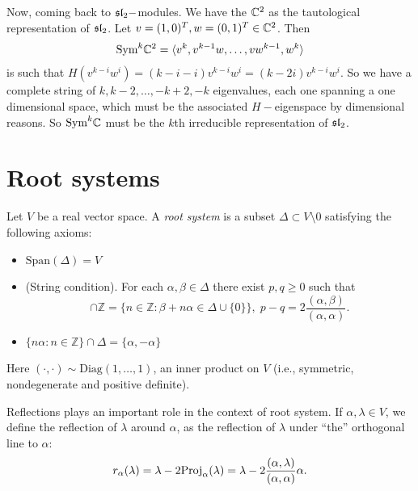 \begin{itemize}
  Now, coming back to $\mathfrak{sl}_2-$modules. We have the $\mathbb{C}^2$ as the tautological representation of $\mathfrak{sl}_2$. Let
  $v=(1,0)^T,w=(0,1)^T\in\mathbb{C}^2$. Then
  \begin{equation}
    \text{Sym}^k\mathbb{C}^2 = \langle v^k, v^{k-1}w,\dots, vw^{k-1}, w^k \rangle
  \end{equation}
  is such that $H(v^{k-i}w^{i})=(k-i-i)v^{k-i}w^{i}=(k-2i)v^{k-i}w^{i}$. 
  So we have a complete string of $k, k-2,\dots, -k+2,-k$ eigenvalues, each one spanning a one dimensional space, which 
  must be the associated $H-$eigenspace by dimensional reasons. So $\text{Sym}^k\mathbb{C}$ must be the $k$th irreducible representation 
  of $\mathfrak{sl}_2$.
\end{itemize}





\section{Root systems}

\begin{dang}
    \begin{definition}
        Let $V$ be a real vector space. A \textit{root system} is a subset $\Delta\subset V\setminus0$ satisfying 
        the following axioms:
        \begin{itemize}
            \item[1.] $\text{Span}(\Delta)=V$
            \item[2.](String condition). For each $\alpha,\beta\in\Delta$ there exist $p,q\geq0$ such that 
            \begin{equation}
                [-p,q]\cap\mathbb{Z}=\{n\in\mathbb{Z}: \beta+n\alpha\in\Delta\cup\{0\}\},
                \;p-q=2\frac{(\alpha,\beta)}{(\alpha,\alpha)}.
            \end{equation}
            \item[3.] $\{n\alpha:n\in\mathbb{Z}\}\cap \Delta=\{\alpha,-\alpha\}$
        \end{itemize}
    \end{definition}
\end{dang}
Here $(\cdot,\cdot)\sim \text{Diag}(1,\dots,1)$, an inner product on $V$ (i.e., symmetric, nondegenerate and 
positive definite). \par

Reflections plays an important role in the context of root system. If $\alpha,\lambda\in V$, we define 
the reflection of $\lambda$ around $\alpha$, as the reflection of $\lambda$ under ``the'' orthogonal 
line to $\alpha$:
\begin{equation}
    r_\alpha(\lambda)=\lambda-2\text{Proj}_\alpha(\lambda)=\lambda-2\frac{(\alpha,\lambda)}{(\alpha,\alpha)}\alpha.
\end{equation}

